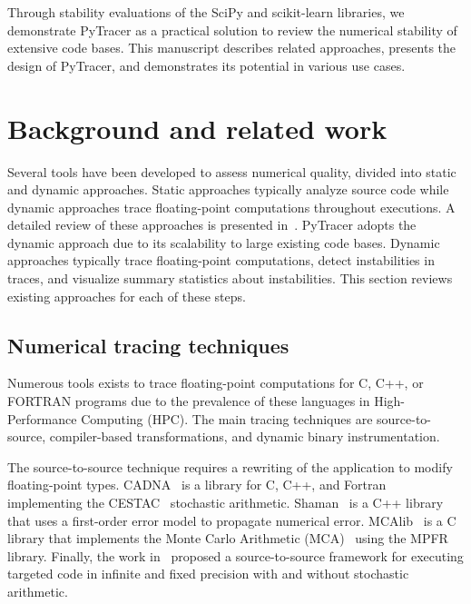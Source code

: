 \documentclass[11pt]{article}
\newcommand{\pytracer}[0]{PyTracer\xspace}
\begin{document}
Through stability evaluations of the
SciPy and scikit-learn libraries, we demonstrate \pytracer as a practical solution to review the numerical stability of extensive code bases. This manuscript describes related approaches, presents the design of \pytracer, and demonstrates its potential in various use cases.


\section{Background and related work}

Several tools have been developed to assess numerical quality, divided into static and dynamic approaches. Static approaches typically analyze source code while dynamic approaches trace floating-point computations throughout executions. A detailed review of these approaches is presented in~\cite{cherubin2020tools}. 
\pytracer adopts the dynamic approach due to its scalability to large existing code bases. Dynamic approaches typically trace floating-point computations, detect instabilities in traces, and visualize summary statistics about instabilities. This section reviews existing approaches for each of these steps. 


\label{sec:soa}
\subsection{Numerical tracing techniques}
Numerous tools exists to trace floating-point computations for C, C++, or FORTRAN programs due to the prevalence of these languages in High-Performance Computing (HPC). 
The main tracing techniques are source-to-source, compiler-based transformations, and dynamic binary instrumentation.

The source-to-source technique requires a rewriting of the application to modify floating-point types. 
CADNA~\cite{jezequel2008cadna} is a library for C, C++, and Fortran implementing the CESTAC~\cite{vignes1993stochastic} stochastic arithmetic. Shaman~\cite{demeure_phd} is a C++ library that uses a first-order error model to propagate numerical error. 
MCAlib~\cite{frechtling2015mcalib} is a C library that implements the Monte Carlo Arithmetic (MCA)~\cite{parker1997monte} using the MPFR~\cite{fousse2007mpfr} library.
Finally, the work in~\cite{tang2016software} proposed a source-to-source framework for executing targeted code in infinite and fixed precision with and without  stochastic arithmetic.
\end{document}
